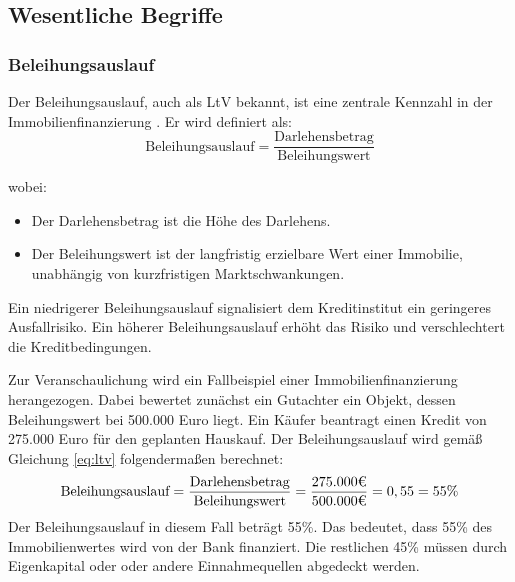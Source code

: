 \subsection{Wesentliche Begriffe}
\subsubsection{Beleihungsauslauf}
Der Beleihungsauslauf, auch als \ac{LtV} bekannt, ist eine zentrale Kennzahl in der Immobilienfinanzierung \parencite{BelWertV_3}. Er wird definiert als:
\begin{equation}
    \text{Beleihungsauslauf} = \frac{\text{Darlehensbetrag}}{\text{Beleihungswert}}
    \label{eq:ltv}
\end{equation}

\noindent wobei:
\begin{itemize}
    \item Der Darlehensbetrag ist die Höhe des Darlehens.
    \item Der Beleihungswert ist der langfristig erzielbare Wert einer Immobilie, unabhängig von kurzfristigen Marktschwankungen.
\end{itemize}

Ein niedrigerer Beleihungsauslauf signalisiert dem Kreditinstitut ein geringeres Ausfallrisiko. Ein höherer Beleihungsauslauf erhöht das Risiko und verschlechtert die Kreditbedingungen.

Zur Veranschaulichung wird ein Fallbeispiel einer Immobilienfinanzierung herangezogen. Dabei bewertet zunächst ein Gutachter ein Objekt, dessen Beleihungswert bei 500.000 Euro liegt. Ein Käufer beantragt einen Kredit von 275.000 Euro für den geplanten Hauskauf.
Der Beleihungsauslauf wird gemäß Gleichung \ref{eq:ltv} folgendermaßen berechnet:
\begin{equation*}
    \text{Beleihungsauslauf} = \frac{\text{Darlehensbetrag}}{\text{Beleihungswert}} = \frac{275.000 \mbox{\texteuro}}{500.000 \mbox{\texteuro}} = 0,55 = 55\%
\end{equation*}
Der Beleihungsauslauf in diesem Fall beträgt 55\%. Das bedeutet, dass 55\% des Immobilienwertes wird von der Bank finanziert. Die restlichen 45\% müssen durch Eigenkapital oder oder andere Einnahmequellen abgedeckt werden.
